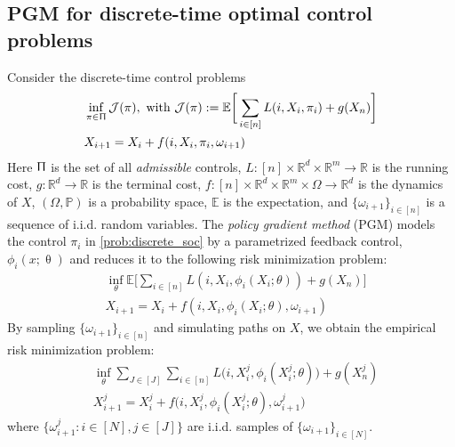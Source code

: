 \documentclass{article}
\numberwithin{equation}{section}
\begin{document}
\subsection{PGM for discrete-time optimal control problems}
 \label{sec:pgm_discrete}
Consider the discrete-time  control problems 
\begin{equation}\label{prob:discrete_soc}
\begin{split}
  &\inf_{\pi\in\Uppi} \mathcal{J}(\pi),\text{ with } \mathcal{J}(\pi):=\mathbb{E}\bigg[\sum_{i\in[n]}L({i},X_{i},\pi_{i})+g(X_n)\bigg]\\
& X_{i+1} = X_{i}+f({i},X_{i},\pi_{i},\omega_{i+1}) 
\end{split}
\end{equation}
Here $\Uppi$ is the set of all \emph{admissible} controls, $L:[n]\times\mathbb{R}^d\times\mathbb{R}^m\to\mathbb{R}$ is the running cost, $g:\mathbb{R}^d\to\mathbb{R}$ is the terminal cost, $f:[n]\times\mathbb{R}^d\times\mathbb{R}^m\times\Omega\to\mathbb{R}^d$ is the dynamics of $X$, $(\Omega,\mathbb{P})$ is a probability space, $\mathbb{E}$ is the expectation, and $\{\omega_{i+1}\}_{i\in[n]}$ is a sequence of i.i.d. random variables. The  \emph{policy gradient method} (PGM) models the control $\pi_{i}$ in \eqref{prob:discrete_soc} by a parametrized feedback control, $\phi_i(x;\uptheta)$ and reduces it to the following risk minimization problem:
\begin{equation}\label{prob:risk_minimization_theta_discrete}
\begin{split}
  &\inf_{\theta} \mathbb{E}\bigg[\sum_{i\in[n]}L({i},X_{i},\phi_{i}(X_{i};\theta))+g(X_n)\bigg]\\
& X_{{i+1}} = X_{i}+f({i},X_{i},\phi_{i}(X_{i};\theta),\omega_{i+1}) 
\end{split}
\end{equation}
By sampling $\{\omega_{i+1}\}_{i\in[n]}$ and simulating paths on $X$, we obtain the empirical risk minimization problem:
\begin{equation}\label{prob:empirical_risk_minimization_theta_discrete}
  \begin{split}
  &\inf_{\theta} \sum_{J\in[J]}\sum_{i\in[n]}L\big({i},X^j_{i},\phi_{i}(X^j_{i};\theta)\big)+g(X^j_n)\\
& X^j_{i+1} = X^j_{i}+f\big({i},X^j_{i},\phi_{i}(X^j_{i};\theta),\omega^j_{i+1}\big) 
\end{split}
\end{equation}
where $\{\omega^j_{i+1}:i\in[N],j\in[J]\}$ are i.i.d. samples of $\{\omega_{i+1}\}_{i\in[N]}$. 
\end{document}
